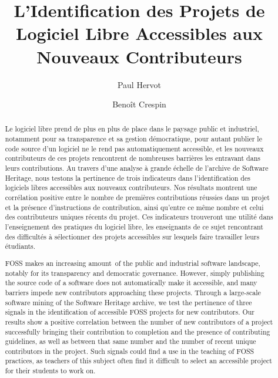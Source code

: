 \documentclass[dvipsnames,runningheads]{llncs}
\title{L'Identification des Projets de Logiciel Libre Accessibles aux Nouveaux Contributeurs}
\author{%
    Paul Hervot\inst{1}%
    \and%
    Benoît Crespin\inst{2}\orcidID{0000-0002-9105-0243}%
}
\institute{EPITA \and Université de Limoge}
\begin{document}
    \maketitle

    \begin{abstract}
        Le logiciel libre prend de plus en plus de place dans le paysage public et industriel, notamment pour
        sa transparence et sa gestion démocratique, pour autant publier le code source d'un logiciel ne le
        rend pas automatiquement accessible, et les nouveaux contributeurs de ces projets rencontrent de
        nombreuses barrières les entravant dans leurs contributions. Au travers d'une analyse à grande échelle
        de l'archive de Software Heritage, nous testons la pertinence de trois indicateurs dans
        l'identification des logiciels libres accessibles aux nouveaux contributeurs. Nos résultats montrent
        une corrélation positive entre le nombre de premières contributions réussies dans un projet et la
        présence d'instructions de contribution, ainsi qu'entre ce même nombre et celui des contributeurs
        uniques récents du projet. Ces indicateurs trouveront une utilité dans l'enseignement des pratiques du
        logiciel libre, les enseignants de ce sujet rencontrant des difficultés à sélectionner des projets
        accessibles sur lesquels faire travailler leurs étudiants.

    \end{abstract}
    \begin{abstract}
        FOSS makes an increasing amount of the public and industrial software landscape, notably for its
        transparency and democratic governance. However, simply publishing the source code of a software does
        not automatically make it accessible, and many barriers impede new contributors approaching these
        projects. Through a large-scale software mining of the Software Heritage archive, we test the
        pertinence of three signals in the identification of accessible FOSS projects for new contributors.
        Our results show a positive correlation between the number of new contributors of a project
        successfully bringing their contribution to completion and the presence of contributing guidelines, as
        well as between that same number and the number of recent unique contributors in the project. Such
        signals could find a use in the teaching of FOSS practices, as teachers of this subject often find it
        difficult to select an accessible project for their students to work on.

    \end{abstract}
\end{document}
